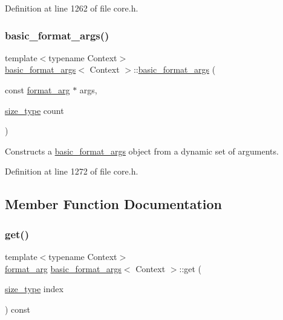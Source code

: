 Definition at line 1262 of file core.\+h.

\mbox{\label{classbasic__format__args_a1ee5ccabb966711853a85daf1ac77689}} 
\subsubsection{\texorpdfstring{basic\+\_\+format\+\_\+args()}{basic\_format\_args()}\hspace{0.1cm}{\footnotesize\ttfamily [3/3]}}
{\footnotesize\ttfamily template$<$typename Context$>$ \\
\hyperlink{classbasic__format__args}{basic\+\_\+format\+\_\+args}$<$ Context $>$\+::\hyperlink{classbasic__format__args}{basic\+\_\+format\+\_\+args} (\begin{DoxyParamCaption}\item[{const \hyperlink{classbasic__format__args_aa8e7659bf8a41ef7cf889bd3edcbc129}{format\+\_\+arg} $\ast$}]{args,  }\item[{\hyperlink{classbasic__format__args_abced2890cde3213027d493494d89c611}{size\+\_\+type}}]{count }\end{DoxyParamCaption})\hspace{0.3cm}{\ttfamily [inline]}}

Constructs a {\ttfamily \hyperlink{classbasic__format__args}{basic\+\_\+format\+\_\+args}} object from a dynamic set of arguments.  

Definition at line 1272 of file core.\+h.



\subsection{Member Function Documentation}
\mbox{\label{classbasic__format__args_ad381a683779a65c09c258faa2a0dbbea}} 
\subsubsection{\texorpdfstring{get()}{get()}}
{\footnotesize\ttfamily template$<$typename Context$>$ \\
\hyperlink{classbasic__format__args_aa8e7659bf8a41ef7cf889bd3edcbc129}{format\+\_\+arg} \hyperlink{classbasic__format__args}{basic\+\_\+format\+\_\+args}$<$ Context $>$\+::get (\begin{DoxyParamCaption}\item[{\hyperlink{classbasic__format__args_abced2890cde3213027d493494d89c611}{size\+\_\+type}}]{index }\end{DoxyParamCaption}) const\hspace{0.3cm}{\ttfamily [inline]}}

